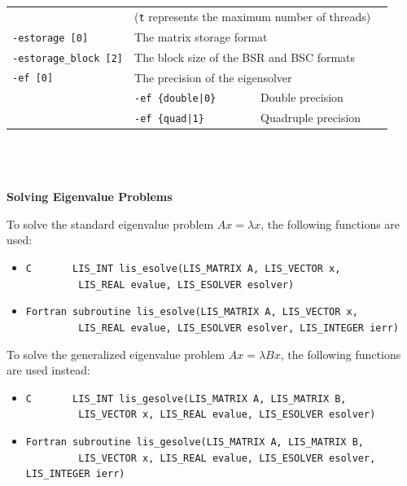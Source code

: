 \documentclass[a4paper]{article}
\begin{document}
\begin{minipage}[t]{\textwidth}
\begin{center}
\begin{tabular}{l|ll}
                            & (\verb=t= represents the maximum number of
 threads) \\
\verb=-estorage [0]=   & The matrix storage format \\
\verb=-estorage_block [2]=& The block size of the BSR and BSC formats\\ 
\verb=-ef [0]=         & The precision of the eigensolver\\
                       & \verb=-ef {double|0}       =  Double precision \\ 
                       & \verb=-ef {quad|1}         =  Quadruple precision \\
\hline         
\end{tabular}
\end{center}
\end{minipage}
\\ \\ \\
\noindent
{\bf Solving Eigenvalue Problems}

To solve the standard eigenvalue problem $Ax = \lambda x$, the following functions are used:
\begin{itemize}
\item \verb|C       LIS_INT lis_esolve(LIS_MATRIX A, LIS_VECTOR x,|\\ 
      \verb|         LIS_REAL evalue, LIS_ESOLVER esolver)|
\item \verb|Fortran subroutine lis_esolve(LIS_MATRIX A, LIS_VECTOR x,|\\
      \verb|         LIS_REAL evalue, LIS_ESOLVER esolver, LIS_INTEGER ierr)|
\end{itemize}
To solve the generalized eigenvalue problem $Ax = \lambda Bx$, the following functions are used instead:
\begin{itemize}
\item \verb|C       LIS_INT lis_gesolve(LIS_MATRIX A, LIS_MATRIX B,|\\ 
      \verb|         LIS_VECTOR x, LIS_REAL evalue, LIS_ESOLVER esolver)|
\item \verb|Fortran subroutine lis_gesolve(LIS_MATRIX A, LIS_MATRIX B,|\\
      \verb|         LIS_VECTOR x, LIS_REAL evalue, LIS_ESOLVER esolver, LIS_INTEGER ierr)|
\end{itemize}
\end{document}
